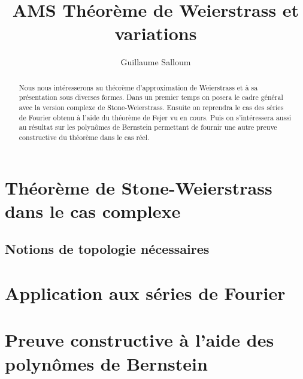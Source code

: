 \documentclass{amsart}
\title{AMS Théorème de Weierstrass et variations}
\author{Guillaume Salloum}
\begin{document}
\begin{abstract}
	Nous nous intéresserons au théorème d'approximation de Weierstrass et
	à sa présentation sous diverses formes. Dans un premier temps on posera le cadre
	général avec la version complexe de Stone-Weierstrass.
	Ensuite on reprendra le cas
	des séries de Fourier obtenu à l'aide du théorème de Fejer vu en cours. 
	Puis on s'intéressera aussi au résultat sur les polynômes de Bernstein permettant
	de fournir une autre preuve constructive du théorème dans le cas réel.
\end{abstract}

\maketitle
\setcounter{tocdepth}{2}
\tableofcontents

\section{Théorème de Stone-Weierstrass dans le cas complexe}
\subsection{Notions de topologie nécessaires}



\section{Application aux séries de Fourier}


\section{Preuve constructive à l'aide des polynômes de Bernstein}

\clearpage
\printbibliography
\end{document}
